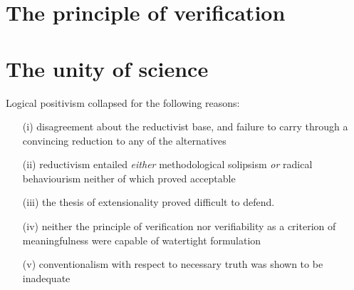 \section{The principle of verification}

\section{The unity of science}

Logical positivism collapsed for the following reasons:

\begin{itemize}
\item[(i)] disagreement about the reductivist base, and failure to carry through a convincing reduction to any of the alternatives



\item[(ii)] reductivism entailed {\it either} methodological solipsism {\it or} radical behaviourism neither of which proved acceptable


\item[(iii)] the thesis of extensionality proved difficult to defend.
\item[(iv)] neither the principle of verification nor verifiability as a criterion of meaningfulness were capable of watertight formulation

 
\item[(v)] conventionalism with respect to necessary truth was shown to be inadequate


\end{itemize}
